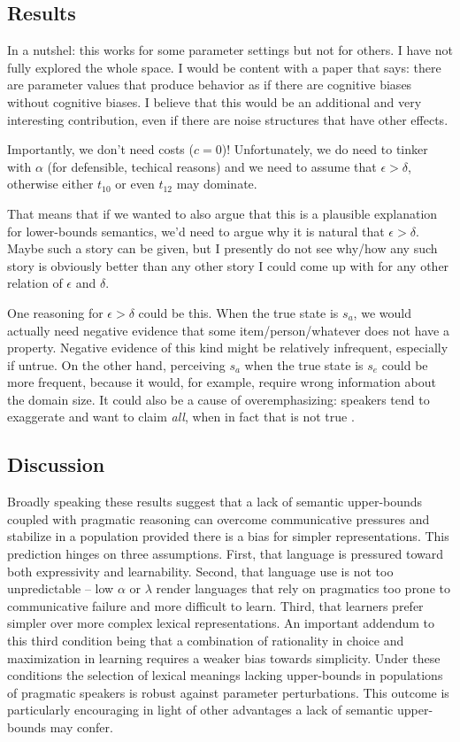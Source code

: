 \documentclass[a4paper]{article}
\begin{document}
\subsection*{Results}

In a nutshel: this works for some parameter settings but not for others. I have not fully
explored the whole space. I would be content with a paper that says: there are parameter values
that produce behavior as if there are cognitive biases without cognitive biases. I believe that
this would be an additional and very interesting contribution, even if there are noise
structures that have other effects.

Importantly, we don't need costs ($c = 0$)! Unfortunately, we do
need to tinker with $\alpha$ (for defensible, techical reasons) and we need to assume that
$\epsilon > \delta$, otherwise either $t_{10}$ or even $t_{12}$ may dominate. 

That means that if we wanted to also argue that this is a plausible explanation for
lower-bounds semantics, we'd need to argue why it is natural that $\epsilon > \delta$. Maybe
such a story can be given, but I presently do not see why/how any such story is obviously
better than any other story I could come up with for any other relation of $\epsilon$ and
$\delta$. 

One reasoning for $\epsilon > \delta$ could be this. When the true state is $s_a$, we would
actually need negative evidence that some item/person/whatever does not have a
property. Negative evidence of this kind might be relatively infrequent, especially if
untrue. On the other hand, perceiving $s_a$ when the true state is $s_e$ could be more
frequent, because it would, for example, require wrong information about the domain size. It
could also be a cause of overemphasizing: speakers tend to exaggerate and want to claim
\emph{all}, when in fact that is not true \citep[e.g.][for a model that has the speakers'
tendency to overemphasize as a motor of language change]{Schaden2012:Modelling-the-A}.


\subsection{Discussion}
Broadly speaking these results suggest that a lack of semantic upper-bounds coupled with pragmatic reasoning can overcome communicative pressures and stabilize in a population provided there is a bias for simpler representations. This prediction hinges on three assumptions. First, that language is pressured toward both expressivity and learnability. Second, that language use is not too unpredictable -- low $\alpha$ or $\lambda$ render languages that rely on pragmatics too prone to communicative failure and more difficult to learn. Third, that learners prefer simpler over more complex lexical representations. An important addendum to this third condition being that a combination of rationality in choice and maximization in learning requires a weaker bias towards simplicity. Under these conditions the selection of lexical meanings lacking upper-bounds in populations of pragmatic speakers is robust against parameter perturbations.  This outcome is particularly encouraging in light of other advantages a lack of semantic upper-bounds may confer. 
\end{document}
